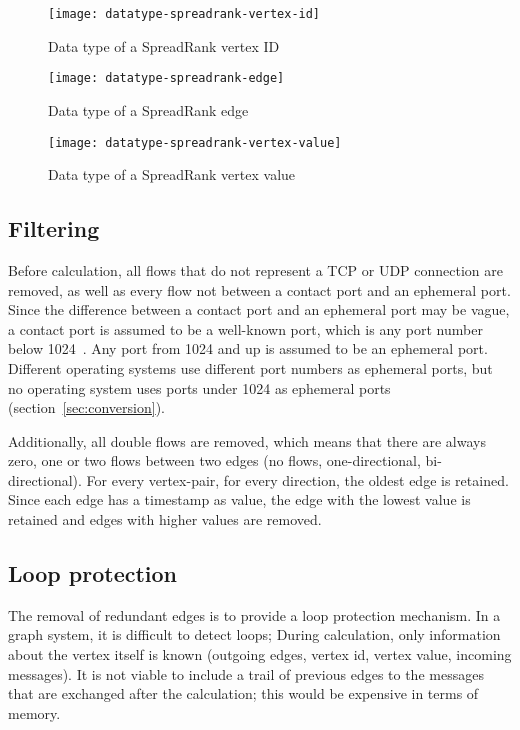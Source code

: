 \begin{figure}[h]
	\caption{Data type of a SpreadRank vertex ID}
	\label{fig:datatype-spreadrank-vertex-id}
	\centering
		\texttt{[image: datatype-spreadrank-vertex-id]}
\end{figure}
\begin{figure}[h]
	\caption{Data type of a SpreadRank edge}
	\label{fig:datatype-spreadrank-edge}
	\centering
		\texttt{[image: datatype-spreadrank-edge]}
\end{figure}
\begin{figure}[h]
	\caption{Data type of a SpreadRank vertex value}
	\label{fig:datatype-spreadrank-vertex-value}
	\centering
		\texttt{[image: datatype-spreadrank-vertex-value]}
\end{figure}


\subsection{Filtering}
\label{sec:filtering}
Before calculation, all flows that do not represent a TCP or UDP connection are removed,
 as well as every flow not between a \gls{contact port} and an \gls{ephemeral port}.
Since the difference between a \gls{contact port} and an \gls{ephemeral port} may be vague,
 a \gls{contact port} is assumed to be a \gls{well-known port}, which is any port number below 1024~\cite{rfc1700}.
Any port from 1024 and up is assumed to be an \gls{ephemeral port}.
Different operating systems use different port numbers as \gls{ephemeral port}s,
 but no operating system uses ports under 1024 as \gls{ephemeral port}s (section~\ref{sec:conversion}).

Additionally, all double flows are removed, which means that there are always zero, one or two flows between two edges (no flows, one-directional, bi-directional).
For every vertex-pair, for every direction, the oldest edge is retained.
Since each edge has a timestamp as value, the edge with the lowest value is retained and edges with higher values are removed.


\subsection{Loop protection}
The removal of redundant edges is to provide a loop protection mechanism.
In a graph system, it is difficult to detect loops;
During calculation, only information about the vertex itself is known (outgoing edges, vertex id, vertex value, incoming messages).
It is not viable to include a trail of previous edges to the messages that are exchanged after the calculation;
 this would be expensive in terms of memory.

